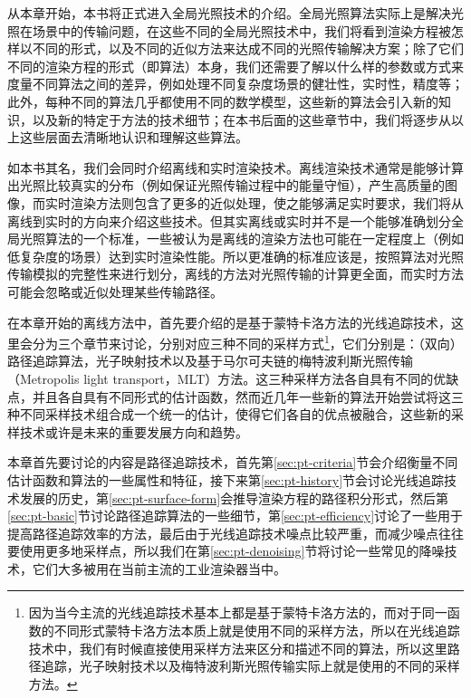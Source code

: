 从本章开始，本书将正式进入全局光照技术的介绍。全局光照算法实际上是解决光照在场景中的传输问题，在这些不同的全局光照技术中，我们将看到渲染方程被怎样以不同的形式，以及不同的近似方法来达成不同的光照传输解决方案；除了它们不同的渲染方程的形式（即算法）本身，我们还需要了解以什么样的参数或方式来度量不同算法之间的差异，例如处理不同复杂度场景的健壮性，实时性，精度等；此外，每种不同的算法几乎都使用不同的数学模型，这些新的算法会引入新的知识，以及新的特定于方法的技术细节；在本书后面的这些章节中，我们将逐步从以上这些层面去清晰地认识和理解这些算法。

如本书其名，我们会同时介绍离线和实时渲染技术。离线渲染技术通常是能够计算出光照比较真实的分布（例如保证光照传输过程中的能量守恒），产生高质量的图像，而实时渲染方法则包含了更多的近似处理，使之能够满足实时要求，我们将从离线到实时的方向来介绍这些技术。但其实离线或实时并不是一个能够准确划分全局光照算法的一个标准，一些被认为是离线的渲染方法也可能在一定程度上（例如低复杂度的场景）达到实时渲染性能。所以更准确的标准应该是，按照算法对光照传输模拟的完整性来进行划分，离线的方法对光照传输的计算更全面，而实时方法可能会忽略或近似处理某些传输路径。

在本章开始的离线方法中，首先要介绍的是基于蒙特卡洛方法的光线追踪技术，这里会分为三个章节来讨论，分别对应三种不同的采样方式\footnote{因为当今主流的光线追踪技术基本上都是基于蒙特卡洛方法的，而对于同一函数的不同形式蒙特卡洛方法本质上就是使用不同的采样方法，所以在光线追踪技术中，我们有时候直接使用采样方法来区分和描述不同的算法，所以这里路径追踪，光子映射技术以及梅特波利斯光照传输实际上就是使用的不同的采样方法。}，它们分别是：（双向）路径追踪算法，光子映射技术以及基于马尔可夫链的梅特波利斯光照传输（Metropolis light transport，MLT）方法。这三种采样方法各自具有不同的优缺点，并且各自具有不同形式的估计函数，然而近几年一些新的算法开始尝试将这三种不同采样技术组合成一个统一的估计，使得它们各自的优点被融合，这些新的采样技术或许是未来的重要发展方向和趋势。

本章首先要讨论的内容是路径追踪技术，首先第\ref{sec:pt-criteria}节会介绍衡量不同估计函数和算法的一些属性和特征，接下来第\ref{sec:pt-history}节会讨论光线追踪技术发展的历史，第\ref{sec:pt-surface-form}会推导渲染方程的路径积分形式，然后第\ref{sec:pt-basic}节讨论路径追踪算法的一些细节，第\ref{sec:pt-efficiency}讨论了一些用于提高路径追踪效率的方法，最后由于光线追踪技术噪点比较严重，而减少噪点往往要使用更多地采样点，所以我们在第\ref{sec:pt-denoising}节将讨论一些常见的降噪技术，它们大多被用在当前主流的工业渲染器当中。






